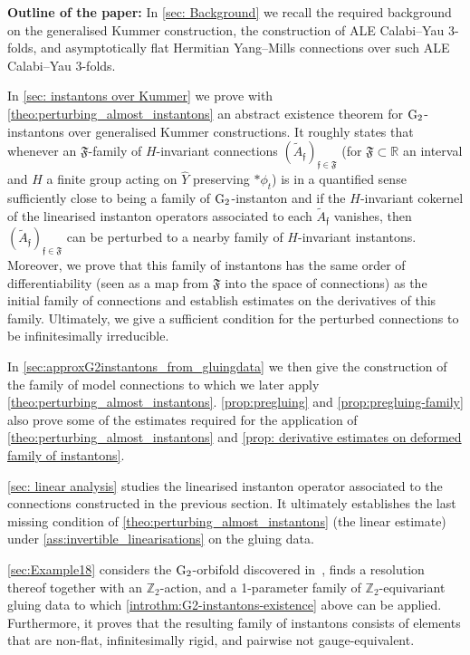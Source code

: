 \documentclass[11pt,a4paper]{scrartcl}
\newcommand{\G}{\textup{G}}
\numberwithin{equation}{section}
\theoremstyle{plain}
\theoremstyle{definition}
\theoremstyle{remark}
\begin{document}
\textbf{Outline of the paper:} In \autoref{sec: Background} we recall the required background on the generalised Kummer construction, the construction of ALE Calabi--Yau 3-folds, and asymptotically flat Hermitian Yang--Mills connections over such ALE Calabi--Yau 3-folds. 

In \autoref{sec: instantons over Kummer} we prove with \autoref{theo:perturbing_almost_instantons} an abstract existence theorem for $\G_2$-instantons over generalised Kummer constructions. It roughly states that whenever an $\mathfrak{F}$-family of $H$-invariant connections $(\tilde{A}_{\mathfrak{f}})_{\mathfrak{f} \in \mathfrak{F}}$ (for $\mathfrak{F}\subset \mathbb{R}$ an interval and $H$ a finite group acting on $\hat{Y}$ preserving $* \phi_t$) is in a quantified sense sufficiently close to being a family of $\G_2$-instanton and if the $H$-invariant cokernel of the linearised instanton operators associated to each $\tilde{A}_{\mathfrak{f}}$ vanishes, then $(\tilde{A}_{\mathfrak{f}})_{\mathfrak{f} \in \mathfrak{F}}$ can be perturbed to a nearby family of $H$-invariant instantons. Moreover, we prove that this family of instantons has the same order of differentiability (seen as a map from $\mathfrak{F}$ into the space of connections) as the initial family of connections and establish estimates on the derivatives of this family. Ultimately, we give a sufficient condition for the perturbed connections to be infinitesimally irreducible. 

In \autoref{sec:approxG2instantons_from_gluingdata} we then give the construction of the family of model connections to which we later apply \autoref{theo:perturbing_almost_instantons}. \autoref{prop:pregluing} and \autoref{prop:pregluing-family} also prove some of the estimates required for the application of \autoref{theo:perturbing_almost_instantons} and  \autoref{prop: derivative estimates on deformed family of instantons}. 

\autoref{sec: linear analysis} studies the linearised instanton operator associated to the connections constructed in the previous section. It ultimately establishes the last missing condition of \autoref{theo:perturbing_almost_instantons} (the linear estimate) under \autoref{ass:invertible_linearisations} on the gluing data. 

\autoref{sec:Example18} considers the $\G_2$-orbifold discovered in~\cite[Example~18]{Joyce-GeneralisedKummer2}, finds a resolution thereof together with an $\mathbb{Z}_2$-action, and a 1-parameter family of $\mathbb{Z}_2$-equivariant gluing data to which \autoref{introthm:G2-instantons-existence} above can be applied. Furthermore, it proves that the resulting family of instantons consists of elements that are non-flat, infinitesimally rigid, and pairwise not gauge-equivalent.
\end{document}
